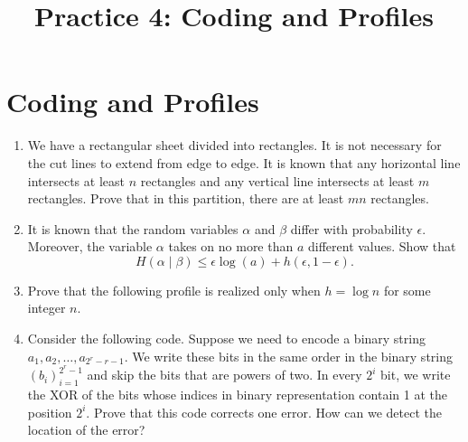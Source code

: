 \documentclass[a4paper]{article}
\title{Practice 4: Coding and Profiles}
\date{\DTMdate{2024-11-06}}
\author{}
\begin{document}
\maketitle

\section*{Coding and Profiles}

\begin{enumerate}

\item We have a rectangular sheet divided into rectangles. It is not necessary for the cut lines to extend from edge to edge. It is known that any horizontal line intersects at least $n$ rectangles and any vertical line intersects at least $m$ rectangles. Prove that in this partition, there are at least $mn$ rectangles.

\item It is known that the random variables $\alpha$ and $\beta$ differ with probability $\epsilon$. Moreover, the variable $\alpha$ takes on no more than $a$ different values. Show that
$$H(\alpha \mid \beta) \leq \epsilon \log(a) + h(\epsilon, 1-\epsilon).$$

\item Prove that the following profile is realized only when $h = \log n$ for some integer $n$.
    \begin{center}
    \end{center}

\item Consider the following code. Suppose we need to encode a binary string $a_1, a_2, \dots, a_{2^r-r-1}$. We write these bits in the same order in the binary string $(b_i)_{i=1}^{2^r-1}$ and skip the bits that are powers of two. In every $2^i$ bit, we write the XOR of the bits whose indices in binary representation contain 1 at the position $2^i$. Prove that this code corrects one error. How can we detect the location of the error?



\end{enumerate}
\end{document}
